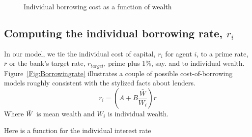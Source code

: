 \begin{figure}
\caption{Individual borrowing cost as a function of wealth}
 \label{Fig:Borrowingratio}
\end{figure}



\subsection{Computing the individual borrowing rate, $r_i$}
In our model, we  tie the individual cost of capital,  $r_i$ for agent $i$, to a prime rate, $\bar r$ or the bank's target rate, $r_{target}$, prime plus 1\%, say. and to individual wealth. Figure~\ref{Fig:Borrowingrate} illustrates a couple of possible  cost-of-borrowing models roughly consistent  with the stylized facts about lenders. 
 \[ r_i = (A + B \frac{\bar{W}}{W_i})\bar r\]
Where $\Bar{W}$ is mean wealth and $W_i$ is individual wealth. 


Here is a function for  the individual interest rate

